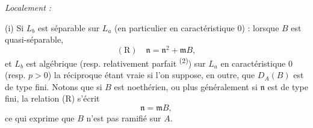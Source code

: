 \textit{Localement :}

(i) Si $L_b$ est séparable sur $L_a$ (en particulier en caractéristique $0$) : lorsque $B$ est quasi-séparable,
\[
(\mathrm R)\quad \mathfrak n=\mathfrak n^2+\mathfrak mB,
\]
et $L_b$ est algébrique (resp. relativement parfait \textsuperscript{(2)}) sur $L_a$ en caractéristique $0$ (resp. $p>0$) la réciproque étant vraie si l'on suppose, en outre, que $D_A(B)$ est de type fini. Notons que si $B$ est noethérien, ou plus généralement si $\mathfrak n$ est de type fini, la relation (R) s'écrit
\[
\mathfrak n=\mathfrak mB,
\]
ce qui exprime que $B$ n'est pas ramifié sur $A$.

